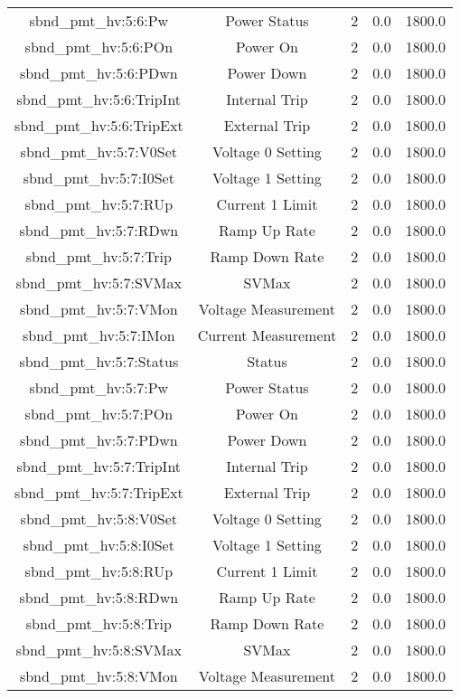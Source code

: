 \begin{center}
\begin{longtable}{c | c c c c }
sbnd\_pmt\_hv:5:6:Pw & Power Status & 2 & 0.0 & 1800.0\\ 
sbnd\_pmt\_hv:5:6:POn & Power On & 2 & 0.0 & 1800.0\\ 
sbnd\_pmt\_hv:5:6:PDwn & Power Down & 2 & 0.0 & 1800.0\\ 
sbnd\_pmt\_hv:5:6:TripInt & Internal Trip & 2 & 0.0 & 1800.0\\ 
sbnd\_pmt\_hv:5:6:TripExt & External Trip & 2 & 0.0 & 1800.0\\ 
sbnd\_pmt\_hv:5:7:V0Set & Voltage 0 Setting & 2 & 0.0 & 1800.0\\ 
sbnd\_pmt\_hv:5:7:I0Set & Voltage 1 Setting & 2 & 0.0 & 1800.0\\ 
sbnd\_pmt\_hv:5:7:RUp & Current 1 Limit & 2 & 0.0 & 1800.0\\ 
sbnd\_pmt\_hv:5:7:RDwn & Ramp Up Rate & 2 & 0.0 & 1800.0\\ 
sbnd\_pmt\_hv:5:7:Trip & Ramp Down Rate & 2 & 0.0 & 1800.0\\ 
sbnd\_pmt\_hv:5:7:SVMax & SVMax & 2 & 0.0 & 1800.0\\ 
sbnd\_pmt\_hv:5:7:VMon & Voltage Measurement & 2 & 0.0 & 1800.0\\ 
sbnd\_pmt\_hv:5:7:IMon & Current Measurement & 2 & 0.0 & 1800.0\\ 
sbnd\_pmt\_hv:5:7:Status & Status & 2 & 0.0 & 1800.0\\ 
sbnd\_pmt\_hv:5:7:Pw & Power Status & 2 & 0.0 & 1800.0\\ 
sbnd\_pmt\_hv:5:7:POn & Power On & 2 & 0.0 & 1800.0\\ 
sbnd\_pmt\_hv:5:7:PDwn & Power Down & 2 & 0.0 & 1800.0\\ 
sbnd\_pmt\_hv:5:7:TripInt & Internal Trip & 2 & 0.0 & 1800.0\\ 
sbnd\_pmt\_hv:5:7:TripExt & External Trip & 2 & 0.0 & 1800.0\\ 
sbnd\_pmt\_hv:5:8:V0Set & Voltage 0 Setting & 2 & 0.0 & 1800.0\\ 
sbnd\_pmt\_hv:5:8:I0Set & Voltage 1 Setting & 2 & 0.0 & 1800.0\\ 
sbnd\_pmt\_hv:5:8:RUp & Current 1 Limit & 2 & 0.0 & 1800.0\\ 
sbnd\_pmt\_hv:5:8:RDwn & Ramp Up Rate & 2 & 0.0 & 1800.0\\ 
sbnd\_pmt\_hv:5:8:Trip & Ramp Down Rate & 2 & 0.0 & 1800.0\\ 
sbnd\_pmt\_hv:5:8:SVMax & SVMax & 2 & 0.0 & 1800.0\\ 
sbnd\_pmt\_hv:5:8:VMon & Voltage Measurement & 2 & 0.0 & 1800.0\\ 

\end{longtable}
\end{center}
